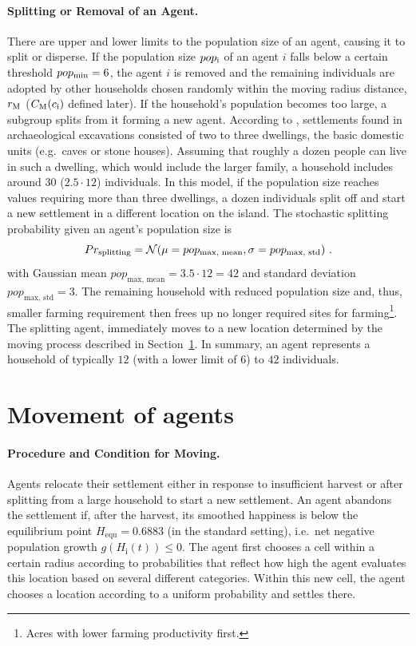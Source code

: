\paragraph{Splitting or Removal of an Agent.}
There are upper and lower limits to the population size of an agent, causing it to split or disperse.
If the population size $pop_{\rm i}$ of an agent $i$ falls below a certain threshold $pop_{\rm min} = 6$, the agent $i$ is removed and the remaining individuals are adopted by other households chosen randomly within the moving radius distance, $r_{\rm M}$ ($C_{\rm M}(c_{\rm i})$ defined later).
If the household's population becomes too large, a subgroup splits from it forming a new agent.
According to \citet{Bahn2017}, settlements found in archaeological excavations consisted of two to three dwellings, the basic domestic units (e.g.\ caves or stone houses). 
Assuming that roughly a dozen people can live in such a dwelling, which would include the larger family, a household includes around $30$ ($2.5\cdot 12$) individuals.
In this model, if the population size reaches values requiring more than three dwellings, a dozen individuals split off and start a new settlement in a different location on the island. 
The stochastic splitting probability given an agent's population size is
\begin{equation}
Pr_{\rm splitting} = \mathcal{N}( \mu = pop_\text{max, mean}, \sigma = pop_\text{max, std})\ .
\end{equation}
with Gaussian mean $pop_\text{max, mean} = 3.5 \cdot 12 = 42$ and standard deviation $pop_\text{max, std} = 3$.
The remaining household with reduced population size and, thus, smaller farming requirement then frees up no longer required sites for farming\footnote{Acres with lower farming productivity first.}.
The splitting agent, immediately moves to a new location determined by the moving process described in Section~\ref{sec:Moving}.
In summary, an agent represents a household of typically $12$ (with a lower limit of $6$) to $42$ individuals. %

\FloatBarrier
\section{Movement of agents}\label{sec:Moving}
\paragraph{Procedure and Condition for Moving.}
Agents relocate their settlement either in response to insufficient harvest or after splitting from a large household to start a new settlement.
An agent abandons the settlement if, after the harvest, its smoothed happiness is below the equilibrium point $H_\text{equ}=0.6883$ (in the standard setting), i.e.\ net negative population growth $g(H_\text{i}(t))\leq 0$.
The agent first chooses a cell within a certain radius according to probabilities that reflect how high the agent evaluates this location based on several different categories.
Within this new cell, the agent chooses a location according to a uniform probability and settles there.

